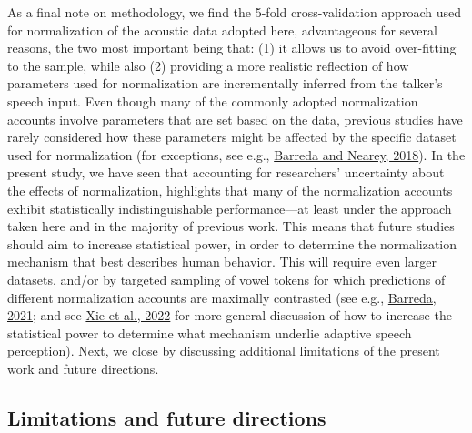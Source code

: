 \documentclass[utf8]{frontiersSCNS}
\begin{document}
As a final note on methodology, we find the 5-fold cross-validation approach used for normalization of the acoustic data adopted here, advantageous for several reasons, the two most important being that: (1) it allows us to avoid over-fitting to the sample, while also (2) providing a more realistic reflection of how parameters used for normalization are incrementally inferred from the talker's speech input. Even though many of the commonly adopted normalization accounts involve parameters that are set based on the data, previous studies have rarely considered how these parameters might be affected by the specific dataset used for normalization (for exceptions, see e.g., \protect\hyperlink{ref-barreda2018a}{Barreda and Nearey, 2018}). In the present study, we have seen that accounting for researchers' uncertainty about the effects of normalization, highlights that many of the normalization accounts exhibit statistically indistinguishable performance---at least under the approach taken here and in the majority of previous work. This means that future studies should aim to increase statistical power, in order to determine the normalization mechanism that best describes human behavior. This will require even larger datasets, and/or by targeted sampling of vowel tokens for which predictions of different normalization accounts are maximally contrasted (see e.g., \protect\hyperlink{ref-barreda2021}{Barreda, 2021}; and see \protect\hyperlink{ref-xie2022}{Xie et al., 2022} for more general discussion of how to increase the statistical power to determine what mechanism underlie adaptive speech perception). Next, we close by discussing additional limitations of the present work and future directions.

\hypertarget{sec:limitations}{%
\subsection*{Limitations and future directions}\label{sec:limitations}}
\end{document}
